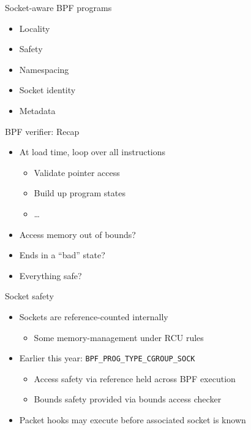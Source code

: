 \documentclass[black,white]{beamer}
\newcommand{\cmark}{\ding{51}}%
\newcommand{\bigcmark}{{\large\textcolor{green}\cmark}}
\newcommand{\xmark}{\ding{55}}
\newcommand{\bigxmark}{{\large\textcolor{red}\xmark}}
\begin{document}
    \begin{frame}{Socket-aware BPF programs}
	\begin{itemize}
            \item Locality \medskip
	    \item Safety \medskip
            \item Namespacing \medskip
            \item Socket identity \medskip
            \item Metadata \medskip
	\end{itemize}
    \end{frame}

    \begin{frame}[fragile]{BPF verifier: Recap}
	\begin{itemize}
	    \item At load time, loop over all instructions \smallskip
            \begin{itemize}
                \item Validate pointer access \medskip
                \item Build up program states \medskip
                \item \ldots \medskip
            \end{itemize}
            \item Access memory out of bounds? \bigxmark \medskip
            \item Ends in a ``bad'' state? \bigxmark \medskip
            \item Everything safe? \bigcmark \medskip
	\end{itemize}
    \end{frame}

    \begin{frame}[fragile]{Socket safety}
        \begin{itemize}
            \item Sockets are reference-counted internally \smallskip
            \begin{itemize}
                \item Some memory-management under RCU rules \medskip
            \end{itemize}
            \item Earlier this year: \verb+BPF_PROG_TYPE_CGROUP_SOCK+ \smallskip
            \begin{itemize}
                \item Access safety via reference held across BPF execution \medskip
                \item Bounds safety provided via bounds access checker \medskip
            \end{itemize}
            \item Packet hooks may execute before associated socket is known \medskip
        \end{itemize}
    \end{frame}
\end{document}

